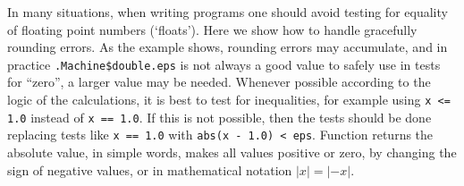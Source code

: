 \documentclass[krantz2]{krantz}\usepackage{knitr}%
\begin{document}
\begin{warningbox}
\index{}In many situations, when writing programs one should avoid testing for equality of floating point numbers (`floats'). Here we show how to handle gracefully rounding errors. As the example shows, rounding errors may accumulate, and in practice \verb|.Machine$double.eps| is not always a good value to safely use in tests for ``zero'', a larger value may be needed. Whenever possible according to the logic of the calculations, it is best to test for inequalities, for example using \verb|x <= 1.0| instead of \verb|x == 1.0|. If this is not possible, then the tests should be done replacing tests like \verb|x == 1.0| with \verb|abs(x - 1.0) < eps|. Function  returns the absolute value, in simple words, makes all values positive or zero, by changing the sign of negative values, or in mathematical notation $|x| = |-x|$.


\end{warningbox}
\end{document}
